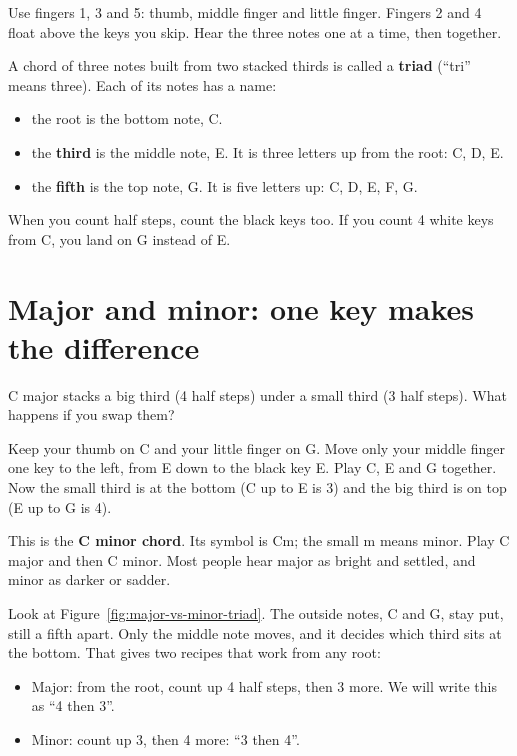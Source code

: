 Use fingers 1, 3 and 5: thumb, middle finger and little finger. Fingers 2 and 4 float above the keys you skip. Hear the three notes one at a time, then together. 

A chord of three notes built from two stacked thirds is called a \textbf{triad} (``tri'' means three). Each of its notes has a name:
\begin{itemize}
  \item the root is the bottom note, C.
  \item the \textbf{third} is the middle note, E. It is three letters up from the root: C, D, E.
  \item the \textbf{fifth} is the top note, G. It is five letters up: C, D, E, F, G.
\end{itemize}

\begin{trapbox}
When you count half steps, count the black keys too. If you count 4 white keys from C, you land on G instead of E.
\end{trapbox}

\section{Major and minor: one key makes the difference}

C major stacks a big third (4 half steps) under a small third (3 half steps). What happens if you swap them?

Keep your thumb on C and your little finger on G. Move only your middle finger one key to the left, from E down to the black key E\fl. Play C, E\fl{} and G together.  Now the small third is at the bottom (C up to E\fl{} is 3) and the big third is on top (E\fl{} up to G is 4).

This is the \textbf{C minor chord}. Its symbol is Cm; the small m means minor. Play C major and then C minor.  Most people hear major as bright and settled, and minor as darker or sadder.

Look at Figure~\ref{fig:major-vs-minor-triad}. The outside notes, C and G, stay put, still a fifth apart. Only the middle note moves, and it decides which third sits at the bottom. That gives two recipes that work from any root:
\begin{itemize}
  \item Major: from the root, count up 4 half steps, then 3 more. We will write this as ``4 then 3''.
  \item Minor: count up 3, then 4 more: ``3 then 4''.
\end{itemize}

